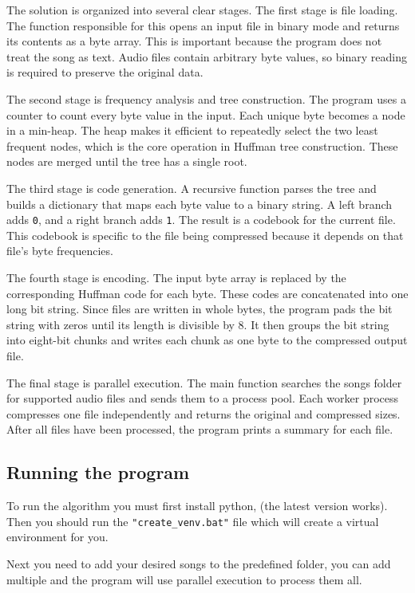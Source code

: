 \documentclass[11pt,a4paper]{article}
\begin{document}
The solution is organized into several clear stages. The first stage is file
loading. The function responsible for this opens an input file in binary mode
and returns its contents as a byte array. This is important because the program
does not treat the song as text. Audio files contain arbitrary byte values, so
binary reading is required to preserve the original data.

The second stage is frequency analysis and tree construction. The program uses a
counter to count every byte value in the input. Each unique byte becomes a node
in a min-heap. The heap makes it efficient to repeatedly select the two least
frequent nodes, which is the core operation in Huffman tree construction. These
nodes are merged until the tree has a single root.

The third stage is code generation. A recursive function parses the tree and
builds a dictionary that maps each byte value to a binary string. A left branch
adds \texttt{0}, and a right branch adds \texttt{1}. The result is a codebook
for the current file. This codebook is specific to the file being compressed
because it depends on that file's byte frequencies.

The fourth stage is encoding. The input byte array is replaced by the
corresponding Huffman code for each byte. These codes are concatenated into one
long bit string. Since files are written in whole bytes, the program pads the
bit string with zeros until its length is divisible by 8. It then groups the bit
string into eight-bit chunks and writes each chunk as one byte to the compressed
output file.

The final stage is parallel execution. The main function searches the songs
folder for supported audio files and sends them to a process pool. Each worker
process compresses one file independently and returns the original and
compressed sizes. After all files have been processed, the program prints a
summary for each file.

\subsection{Running the program}

To run the algorithm you must first install python, (the latest version works). Then you should run the \texttt{"create\_venv.bat"} file which will create a virtual environment for you.

Next you need to add your desired songs to the predefined folder, you can add multiple and the program will use parallel execution to process them all.
\end{document}
